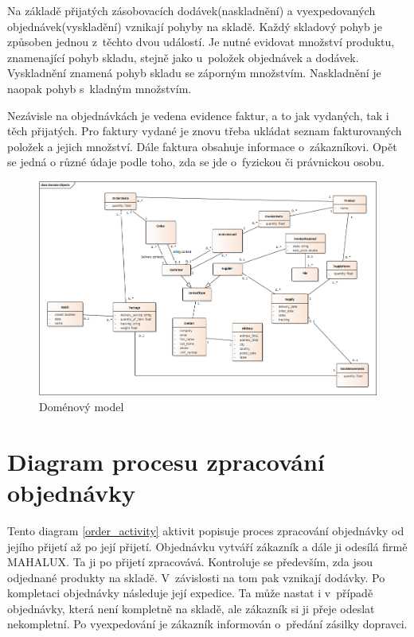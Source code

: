 \documentclass[thesis=B,czech]{FITthesis}[2012/06/26]
\begin{document}
	Na základě přijatých zásobovacích dodávek(naskladnění) a vyexpedovaných objednávek(vyskladění) vznikají pohyby na skladě. Každý skladový pohyb je způsoben jednou z~těchto dvou událostí. Je nutné evidovat množství produktu, znamenající pohyb skladu, stejně jako u~položek objednávek a dodávek. Vyskladnění znamená pohyb skladu se záporným množstvím. Naskladnění je naopak pohyb s~kladným množstvím.
	
	Nezávisle na objednávkách je vedena evidence faktur, a to jak vydaných, tak i těch přijatých. Pro faktury vydané je znovu třeba ukládat seznam fakturovaných položek a jejich množství. Dále faktura obsahuje informace o~zákazníkovi. Opět se jedná o různé údaje podle toho, zda se jde o~fyzickou či právnickou osobu. 
	
\begin{figure}
	\includegraphics[height=\textwidth, angle=90]{domain_model.png}
	\caption{Doménový model}\label{domain_model}
\end{figure}

\section{Diagram procesu zpracování objednávky}
	Tento diagram \ref{order_activity} aktivit popisuje proces zpracování objednávky od jejího přijetí až po její přijetí. Objednávku vytváří zákazník a dále ji odesílá firmě MAHALUX. Ta ji po přijetí zpracovává. Kontroluje se především, zda jsou odjednané produkty na skladě. V~závislosti na tom pak vznikají dodávky. Po kompletaci objednávky následuje její expedice. Ta může nastat i v~případě objednávky, která není kompletně na skladě, ale zákazník si ji přeje odeslat nekompletní. Po vyexpedování je zákazník informován o~předání zásilky dopravci.
\end{document}
